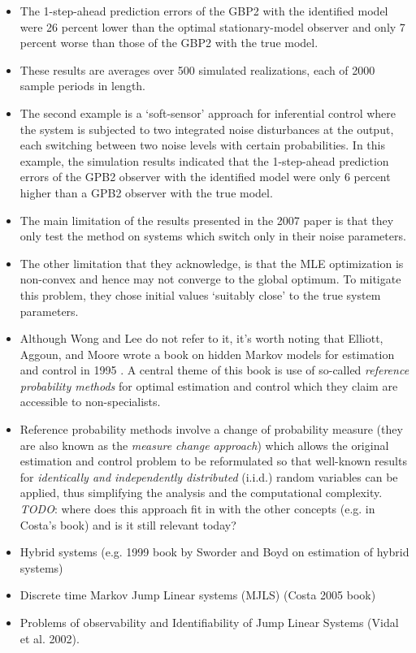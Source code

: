 \begin{itemize}
	\item The 1-step-ahead prediction errors of the GBP2 with the identified model were 26 percent lower than the optimal stationary-model observer and only 7 percent worse than those of the GBP2 with the true model.
	\item These results are averages over 500 simulated realizations, each of 2000 sample periods in length.
	\item The second example is a `soft-sensor' approach for inferential control where the system is subjected to two integrated noise disturbances at the output, each switching between two noise levels with certain probabilities. In this example, the simulation results indicated that the 1-step-ahead prediction errors of the GPB2 observer with the identified model were only 6 percent higher than a GPB2 observer with the true model.
	\item The main limitation of the results presented in the 2007 paper is that they only test the method on systems which switch only in their noise parameters.
	\item The other limitation that they acknowledge, is that the MLE optimization is non-convex and hence may not converge to the global optimum. To mitigate this problem, they chose initial values `suitably close' to the true system parameters.
	\item Although Wong and Lee do not refer to it, it's worth noting that Elliott, Aggoun, and Moore wrote a book on hidden Markov models for estimation and control in 1995 \cite{elliott_hidden_1995}. A central theme of this book is use of so-called \textit{reference probability methods} for optimal estimation and control which they claim are accessible to non-specialists.
	\item Reference probability methods involve a change of probability measure (they are also known as the \textit{measure change approach}) which allows the original estimation and control problem to be reformulated so that well-known results for \textit{identically and independently distributed} (i.i.d.) random variables can be applied, thus simplifying the analysis and the computational complexity. \emph{TODO}: where does this approach fit in with the other concepts (e.g. in Costa's book) and is it still relevant today?
	\item Hybrid systems (e.g. 1999 book by Sworder and Boyd on estimation of hybrid systems)
	\item Discrete time Markov Jump Linear systems (MJLS) (Costa 2005 book)
	\item Problems of observability and Identifiability of Jump Linear Systems (Vidal et al. 2002).

\end{itemize}
